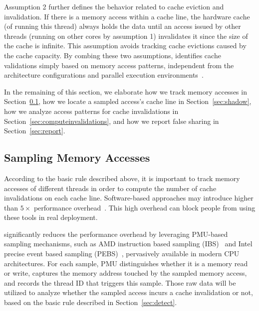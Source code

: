 Assumption 2 further defines the behavior related to cache eviction and invalidation. 
If there is a memory access within a cache line, the hardware cache (of running this thread) always holds the data until an access issued by other threads (running on other cores by assumption 1) invalidates it since the size of the cache is infinite. This assumption avoids tracking cache evictions caused by the cache capacity. 
By combing these two assumptions, \cheetah{} identifies cache validations simply based on memory access patterns, independent from the architecture configurations and parallel execution environments~\cite{Predator, qinzhao}. 

In the remaining of this section, we elaborate how we track memory accesses in Section~\ref{sec:perfcounter}, how we locate a sampled access's cache line in Section~\ref{sec:shadow}, how we analyze access patterns for cache invalidations in Section~\ref{sec:computeinvalidations}, and how we report false sharing in Section~\ref{sec:report}.

\subsection{Sampling Memory Accesses}
\label{sec:perfcounter}

According to the basic rule described above, it is important to track memory accesses of different threads in order to compute the number of cache invalidations on each cache line. Software-based approaches may introduce higher than $5\times$ performance overhead~\cite{Predator, qinzhao}. This high overhead can block people from using these tools in real deployment.

\cheetah{} significantly reduces the performance overhead by leveraging PMU-based sampling mechanisms, such as AMD instruction based sampling (IBS)~\cite{AMDIBS:07} and Intel precise event based sampling (PEBS)~\cite{IntelArch:PEBS:Sept09}, pervasively available in modern CPU architectures. For each sample, PMU distinguishes whether it is a memory read or write, captures the memory address touched by the sampled memory access, and records the thread ID that triggers this sample. Those raw data will be utilized to analyze whether the sampled access incurs a cache invalidation or not, based on the basic rule described in Section~\ref{sec:detect}.

